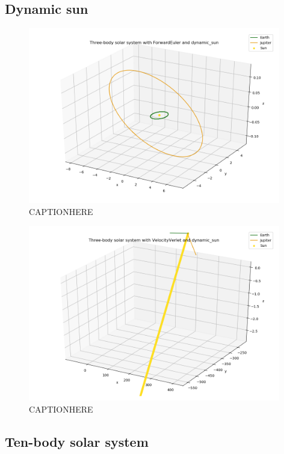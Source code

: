 \documentclass{article}
\begin{document}
\subsection{Dynamic sun}

    \begin{figure}[H]
        \centering
        \includegraphics[width = 11cm]{img/plot3D_S_E_J_F_dynamic_sun.png}
        \caption{CAPTIONHERE}
        \label{fig:plot3D_S_E_J_F_dynamic_sun}
    \end{figure}

    \begin{figure}[H]
        \centering
        \includegraphics[width = 11cm]{img/plot3D_S_E_J_V_dynamic_sun.png}
        \caption{CAPTIONHERE}
        \label{fig:plot3D_S_E_J_V_dynamic_sun}
    \end{figure}



\subsection{Ten-body solar system}
\end{document}
